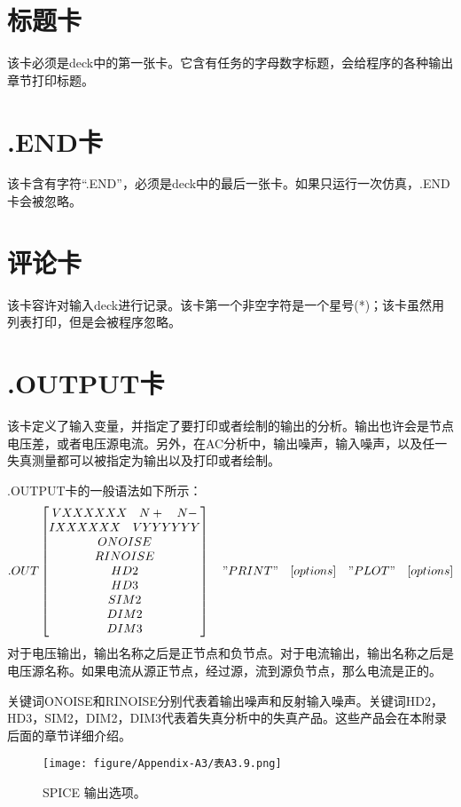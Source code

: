 \section{标题卡}
该卡必须是deck中的第一张卡。它含有任务的字母数字标题，会给程序的各种输出章节打印标题。

\section{.END卡}
该卡含有字符“.END”，必须是deck中的最后一张卡。如果只运行一次仿真，.END卡会被忽略。

\section{评论卡}
该卡容许对输入deck进行记录。该卡第一个非空字符是一个星号(*)；该卡虽然用列表打印，但是会被程序忽略。

\section{.OUTPUT卡}
该卡定义了输入变量，并指定了要打印或者绘制的输出的分析。输出也许会是节点电压差，或者电压源电流。另外，在AC分析中，输出噪声，输入噪声，以及任一失真测量都可以被指定为输出以及打印或者绘制。

.OUTPUT卡的一般语法如下所示：
\begin{equation*}
.OUT \begin{bmatrix}
VXXXXXX \quad N+ \quad N- \\
IXXXXXX \quad VYYYYYY \\
ONOISE \\
RINOISE \\
HD2 \\
HD3 \\
SIM2 \\
DIM2 \\
DIM3
\end{bmatrix}\quad "PRINT"\quad [options]\quad "PLOT"\quad [options]
\end{equation*}
对于电压输出，输出名称之后是正节点和负节点。对于电流输出，输出名称之后是电压源名称。如果电流从源正节点，经过源，流到源负节点，那么电流是正的。

关键词ONOISE和RINOISE分别代表着输出噪声和反射输入噪声。关键词HD2，HD3，SIM2，DIM2，DIM3代表着失真分析中的失真产品。这些产品会在本附录后面的章节详细介绍。

\begin{figure}[htbp]
\small
    \centering
    \texttt{[image: figure/Appendix-A3/表A3.9.png]}
    \caption{SPICE 输出选项。}
    \label{表A3.9}
\end{figure}

